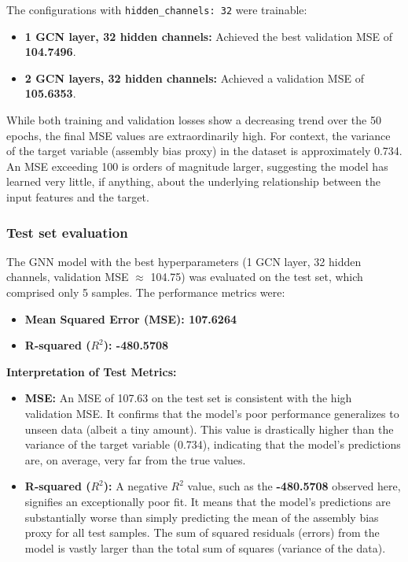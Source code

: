 \documentclass[twocolumn]{aastex631}
\begin{document}
The configurations with \texttt{hidden\_channels: 32} were trainable:
\begin{itemize}
    \item \textbf{1 GCN layer, 32 hidden channels:} Achieved the best validation MSE of \textbf{104.7496}.
    \item \textbf{2 GCN layers, 32 hidden channels:} Achieved a validation MSE of \textbf{105.6353}.
\end{itemize}

While both training and validation losses show a decreasing trend over the 50 epochs, the final MSE values are extraordinarily high. For context, the variance of the target variable (assembly bias proxy) in the dataset is approximately 0.734. An MSE exceeding 100 is orders of magnitude larger, suggesting the model has learned very little, if anything, about the underlying relationship between the input features and the target.

\subsubsection{Test set evaluation}
The GNN model with the best hyperparameters (1 GCN layer, 32 hidden channels, validation MSE $\approx$ 104.75) was evaluated on the test set, which comprised only 5 samples. The performance metrics were:
\begin{itemize}
    \item \textbf{Mean Squared Error (MSE): 107.6264}
    \item \textbf{R-squared ($R^2$): -480.5708}
\end{itemize}

\textbf{Interpretation of Test Metrics:}
\begin{itemize}
    \item \textbf{MSE:} An MSE of 107.63 on the test set is consistent with the high validation MSE. It confirms that the model's poor performance generalizes to unseen data (albeit a tiny amount). This value is drastically higher than the variance of the target variable (0.734), indicating that the model's predictions are, on average, very far from the true values.
    \item \textbf{R-squared ($R^2$):} A negative $R^2$ value, such as the \textbf{-480.5708} observed here, signifies an exceptionally poor fit. It means that the model's predictions are substantially worse than simply predicting the mean of the assembly bias proxy for all test samples. The sum of squared residuals (errors) from the model is vastly larger than the total sum of squares (variance of the data).
\end{itemize}
\end{document}
